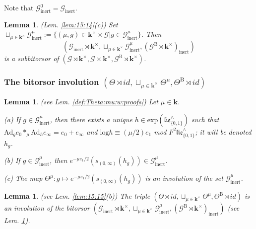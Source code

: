 \documentclass[10pt]{amsart}
\newtheorem{lem}[thm]{Lemma}
\numberwithin{equation}{subsection}
\begin{document}
Note that $\mathcal G_{\mathrm{inert}}^0=\mathcal G_{\mathrm{inert}}$.  

\begin{lem}\label{lem:G:mu} 
(Lem. \ref{lem:15:14}(c))
 Set $\sqcup_{\mu\in\mathbf k^\times}\mathcal G_{\mathrm{inert}}^\mu:=\{(\mu,g)\in
 \mathbf k^\times\times \mathcal G|g\in \mathcal G_{\mathrm{inert}}^\mu\}$. Then 
 $$
 (\mathcal G_{\mathrm{inert}} \rtimes \mathbf k^\times,
\sqcup_{\mu\in\mathbf k^\times}\mathcal G_{\mathrm{inert}}^\mu,
(\mathcal G^{\mathrm B} \rtimes \mathbf k^\times)_{\mathrm{inert}})
$$ 
is a subbitorsor of $(\mathcal G\rtimes\mathbf k^\times,\mathcal G\times
    \mathbf k^\times,\mathcal G^{\mathrm B}\rtimes\mathbf k^\times)$. 
\end{lem}

\subsubsection{The bitorsor involution 
$(\Theta\rtimes id,\sqcup_{\mu\in\mathbf k^\times}\Theta^\mu,\Theta^{\mathrm B}\rtimes id)$}


\begin{lem}\label{def:Theta:mu} (see Lem. \ref{def:Theta:mu:w:proofs})
Let $\mu\in\mathbf k$. 

    (a) If $g\in \mathcal G_{\mathrm{inert}}^\mu$, then there exists a unique 
    $h\in\mathrm{exp}(\mathfrak{lie}_{\{0,1\}}^\wedge)$ such that 
 $\mathrm{Ad}_ge_0*_\mu \mathrm{Ad}_he_\infty
 =e_0+e_\infty%
 $ and $\mathrm{log}h\equiv (\mu/2)e_1$ mod $F^2\mathfrak{lie}_{\{0,1\}}^\wedge$; it 
    will be denoted $h_g$.

    (b) If $g\in \mathcal G_{\mathrm{inert}}^\mu$, then 
    $e^{-\mu e_1/2}(s_{(0,\infty)}(h_g))\in \mathcal G_{\mathrm{inert}}^\mu$. 

    (c) The map $\Theta^\mu : g\mapsto e^{-\mu e_1/2}(s_{(0,\infty)}(h_g))$ is an involution of the set $\mathcal G_{\mathrm{inert}}^\mu$. 
\end{lem}


\begin{lem}\label{lem:invol:bitorsor} (see Lem. \ref{lem:15:15}(b))
    The triple
$(\Theta\rtimes id,\sqcup_{\mu\in\mathbf k^\times}\Theta^\mu,\Theta^{\mathrm B}\rtimes id)$
is an involution of the bitorsor 
$(\mathcal G_{\mathrm{inert}} \rtimes \mathbf k^\times,
\sqcup_{\mu\in\mathbf k^\times}\mathcal G_{\mathrm{inert}}^\mu,
(\mathcal G^{\mathrm B} \rtimes \mathbf k^\times)_{\mathrm{inert}})$ (see Lem. \ref{lem:G:mu}). 
\end{lem}
\end{document}
